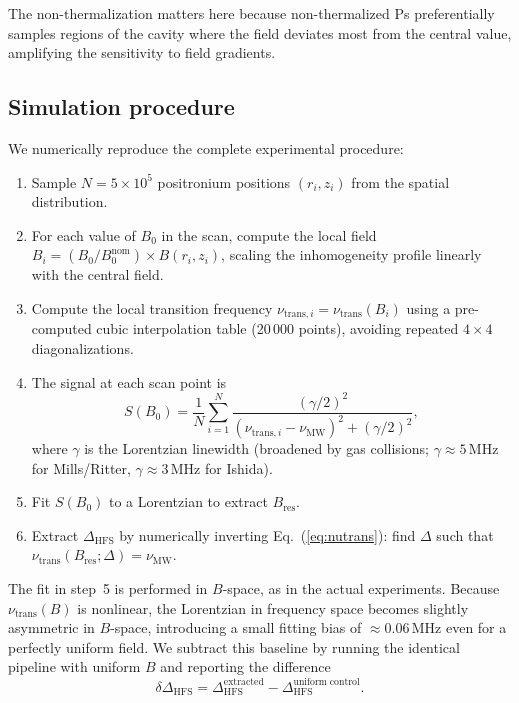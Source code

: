 \documentclass[twocolumn,pra,aps,superscriptaddress,floatfix,10pt]{revtex4-2}
\begin{document}
The non-thermalization matters here because non-thermalized Ps preferentially samples regions of the cavity where the field deviates most from the central value, amplifying the sensitivity to field gradients.

\subsection{Simulation procedure}
\label{sec:simulation}

We numerically reproduce the complete experimental procedure:

\begin{enumerate}
  \item Sample $N = 5 \times 10^5$ positronium positions $(r_i, z_i)$ from the spatial distribution.
  \item For each value of $B_0$ in the scan, compute the local field $B_i = (B_0/B_0^\mathrm{nom}) \times B(r_i, z_i)$, scaling the inhomogeneity profile linearly with the central field.
  \item Compute the local transition frequency $\nu_{\mathrm{trans},i} = \nu_\mathrm{trans}(B_i)$ using a pre-computed cubic interpolation table (20\,000 points), avoiding repeated $4 \times 4$ diagonalizations.
  \item The signal at each scan point is
  \begin{equation}
    S(B_0) = \frac{1}{N}\sum_{i=1}^N \frac{(\gamma/2)^2}{(\nu_{\mathrm{trans},i} - \nu_\mathrm{MW})^2 + (\gamma/2)^2},
    \label{eq:signal}
  \end{equation}
  where $\gamma$ is the Lorentzian linewidth (broadened by gas collisions; $\gamma \approx 5$\,MHz for Mills/Ritter, $\gamma \approx 3$\,MHz for Ishida).
  \item Fit $S(B_0)$ to a Lorentzian to extract $B_\mathrm{res}$.
  \item Extract $\Delta_\mathrm{HFS}$ by numerically inverting Eq.~(\ref{eq:nutrans}): find $\Delta$ such that $\nu_\mathrm{trans}(B_\mathrm{res}; \Delta) = \nu_\mathrm{MW}$.
\end{enumerate}

The fit in step~5 is performed in $B$-space, as in the actual experiments. Because $\nu_\mathrm{trans}(B)$ is nonlinear, the Lorentzian in frequency space becomes slightly asymmetric in $B$-space, introducing a small fitting bias of $\approx 0.06$\,MHz even for a perfectly uniform field. We subtract this baseline by running the identical pipeline with uniform $B$ and reporting the difference
\begin{equation}
  \delta\Delta_\mathrm{HFS} = \Delta_\mathrm{HFS}^\mathrm{extracted} - \Delta_\mathrm{HFS}^\mathrm{uniform\;control}.
  \label{eq:shift}
\end{equation}
\end{document}
